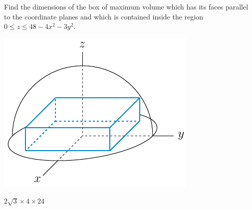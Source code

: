 \begin{question}[M200 2002A] %
Find the dimensions of the box of maximum volume which has
its faces parallel to the coordinate planes and which is contained inside
the region $0\le z\le 48-4x^2-3y^2$.
\begin{center}
     \includegraphics{fig/inscSpher.pdf}
\end{center}
\end{question}


\begin{answer}
$2\sqrt{3} \times 4\times 24$
\end{answer}

